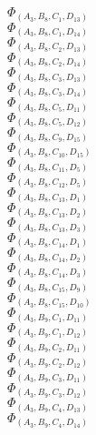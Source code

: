 \documentclass[14pt]{article}
\begin{document}
    $\Phi_{({A}_{3}, {B}_{8}, {C}_{1}, {D}_{13})}$ \\ 
    $\Phi_{({A}_{3}, {B}_{8}, {C}_{1}, {D}_{14})}$ \\ 
    $\Phi_{({A}_{3}, {B}_{8}, {C}_{2}, {D}_{13})}$ \\ 
    $\Phi_{({A}_{3}, {B}_{8}, {C}_{2}, {D}_{14})}$ \\ 
    $\Phi_{({A}_{3}, {B}_{8}, {C}_{3}, {D}_{13})}$ \\ 
    $\Phi_{({A}_{3}, {B}_{8}, {C}_{3}, {D}_{14})}$ \\ 
    $\Phi_{({A}_{3}, {B}_{8}, {C}_{5}, {D}_{11})}$ \\ 
    $\Phi_{({A}_{3}, {B}_{8}, {C}_{5}, {D}_{12})}$ \\ 
    $\Phi_{({A}_{3}, {B}_{8}, {C}_{9}, {D}_{15})}$ \\ 
    $\Phi_{({A}_{3}, {B}_{8}, {C}_{10}, {D}_{15})}$ \\ 
    $\Phi_{({A}_{3}, {B}_{8}, {C}_{11}, {D}_{5})}$ \\ 
    $\Phi_{({A}_{3}, {B}_{8}, {C}_{12}, {D}_{5})}$ \\ 
    $\Phi_{({A}_{3}, {B}_{8}, {C}_{13}, {D}_{1})}$ \\ 
    $\Phi_{({A}_{3}, {B}_{8}, {C}_{13}, {D}_{2})}$ \\ 
    $\Phi_{({A}_{3}, {B}_{8}, {C}_{13}, {D}_{3})}$ \\ 
    $\Phi_{({A}_{3}, {B}_{8}, {C}_{14}, {D}_{1})}$ \\ 
    $\Phi_{({A}_{3}, {B}_{8}, {C}_{14}, {D}_{2})}$ \\ 
    $\Phi_{({A}_{3}, {B}_{8}, {C}_{14}, {D}_{3})}$ \\ 
    $\Phi_{({A}_{3}, {B}_{8}, {C}_{15}, {D}_{9})}$ \\ 
    $\Phi_{({A}_{3}, {B}_{8}, {C}_{15}, {D}_{10})}$ \\ 
    $\Phi_{({A}_{3}, {B}_{9}, {C}_{1}, {D}_{11})}$ \\ 
    $\Phi_{({A}_{3}, {B}_{9}, {C}_{1}, {D}_{12})}$ \\ 
    $\Phi_{({A}_{3}, {B}_{9}, {C}_{2}, {D}_{11})}$ \\ 
    $\Phi_{({A}_{3}, {B}_{9}, {C}_{2}, {D}_{12})}$ \\ 
    $\Phi_{({A}_{3}, {B}_{9}, {C}_{3}, {D}_{11})}$ \\ 
    $\Phi_{({A}_{3}, {B}_{9}, {C}_{3}, {D}_{12})}$ \\ 
    $\Phi_{({A}_{3}, {B}_{9}, {C}_{4}, {D}_{13})}$ \\ 
    $\Phi_{({A}_{3}, {B}_{9}, {C}_{4}, {D}_{14})}$ \\ 
\end{document}
